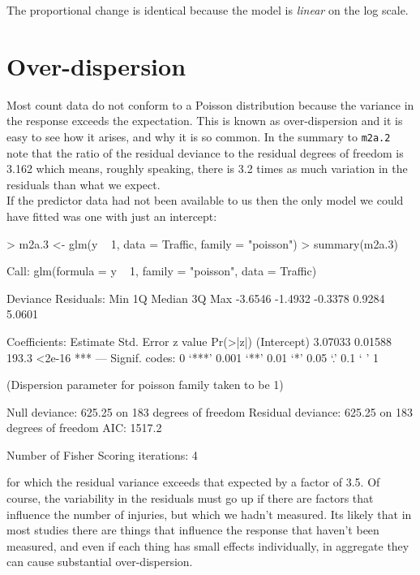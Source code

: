 \documentclass{article}
\begin{document}
The proportional change is identical because the model is \emph{linear} on the log scale.

\section{Over-dispersion}  

Most count data do not conform to a Poisson distribution because the variance in the response exceeds the expectation. This is known as over-dispersion and it is easy to see how it arises, and why it is so common. In the summary to \texttt{m2a.2} note that the ratio of the residual deviance  
to the residual degrees of freedom is 3.162 which means, roughly speaking, there is 3.2 times as much variation in the residuals than what we expect.\\

If the predictor data had not been available to us then the only model we could have fitted was one with just an intercept: 

\begin{Schunk}
\begin{Sinput}
> m2a.3 <- glm(y ~ 1, data = Traffic, family = "poisson")
> summary(m2a.3)
\end{Sinput}
\begin{Soutput}
Call:
glm(formula = y ~ 1, family = "poisson", data = Traffic)

Deviance Residuals: 
    Min       1Q   Median       3Q      Max  
-3.6546  -1.4932  -0.3378   0.9284   5.0601  

Coefficients:
            Estimate Std. Error z value Pr(>|z|)    
(Intercept)  3.07033    0.01588   193.3   <2e-16 ***
---
Signif. codes:  0 `***' 0.001 `**' 0.01 `*' 0.05 `.' 0.1 ` ' 1 

(Dispersion parameter for poisson family taken to be 1)

    Null deviance: 625.25  on 183  degrees of freedom
Residual deviance: 625.25  on 183  degrees of freedom
AIC: 1517.2

Number of Fisher Scoring iterations: 4
\end{Soutput}
\end{Schunk}

for which the residual variance exceeds that expected by a factor of 3.5. Of course, the variability in the residuals must go up if there are factors that influence the number of injuries, but which we hadn't measured. Its likely that in most studies there are things that influence the response that haven't been measured, and even if each thing has small effects individually, in aggregate they can cause substantial over-dispersion.
\end{document}
